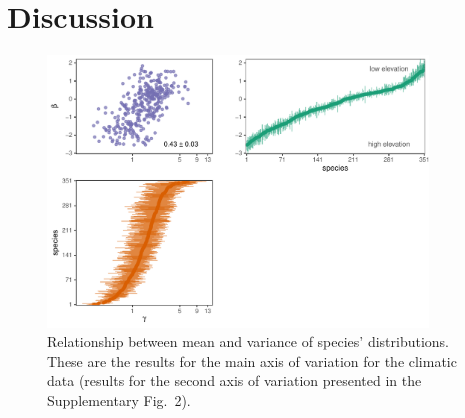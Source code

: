 \documentclass[11pt, a4paper]{article}
\begin{document}
\section*{Discussion}
% 




\begin{figure}[ht]
  \centering
    \vspace{0.5cm}
    \includegraphics[width=0.9\textwidth]{figures/figure1}
    	  \vspace{0.3cm}
	   \caption{Relationship between mean and variance of species' distributions. These are the results for the main axis of variation for the climatic data (results for the second axis of variation presented in the Supplementary Fig.~2).}
      \label{fig:correlation}
\end{figure}
\end{document}
